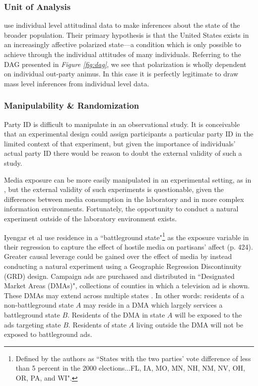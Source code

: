 \documentclass[12pt]{article}
\begin{document}
\subsubsection{Unit of Analysis}

\citeauthor{iyengar2012affect} use individual level attitudinal data to make inferences about the state of the broader population. Their primary hypothesis is that the United States exists in an increasingly affective polarized state---a condition which is only possible to achieve through the individual attitudes of many individuals. Referring to the DAG presented in \textit{Figure \ref{fig:dag}}, we see that polarization is wholly dependent on individual out-party animus. In this case it is perfectly legitimate to draw mass level inferences from individual level data.

\subsubsection{Manipulability \& Randomization}

Party ID is difficult to manipulate in an observational study. It is conceivable that an experimental design could assign participants a particular party ID in the limited context of that experiment, but given the importance of individuals’ actual party ID there would be reason to doubt the external validity of such a study. 

Media exposure can be more easily manipulated in an experimental setting, as in \citet{mutz2007effects}, but the external validity of such experiments is questionable, given the differences between media consumption in the laboratory and in more complex information environments. Fortunately, the opportunity to conduct a natural experiment outside of the laboratory environment exists.

Iyengar et al use residence in a ``battleground state"\footnote{Defined by the authors as ``States with the two parties’ vote difference of less than 5 percent in the 2000 elections...FL, IA, MO, MN, NH, NM, NV, OH, OR, PA, and WI".} as the exposure variable in their regression to capture the effect of hostile media on partisans' affect (p. 424). Greater causal leverage could be gained over the effect of media by instead conducting a natural experiment using a Geographic Regression Discontinuity (GRD) design. Campaign ads are purchased and distributed in ``Designated Market Areas (DMAs)", collections of counties in which a television ad is shown. These DMAs may extend across multiple states \citep{keele2015geographic}. In other words: residents of a non-battleground state $A$ may reside in a DMA which largely services a battleground state $B$. Residents of the DMA in state $A$ will be exposed to the ads targeting state $B$. Residents of state $A$ living outside the DMA will not be exposed to battleground ads.
\end{document}
